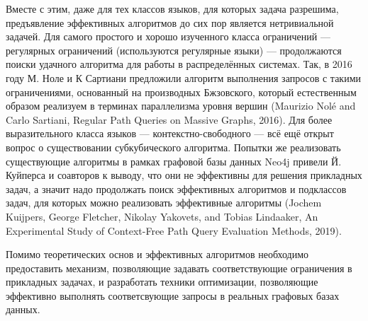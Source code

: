 \documentclass[12pt]{article}  %
\theoremstyle{remark}
\begin{document}
Вместе с этим, даже для тех классов языков, для которых задача разрешима, предъявление эффективных алгоритмов до сих пор является нетривиальной задачей.
Для самого простого и хорошо изученного класса ограничений --- регулярных ограничений (используются регулярные языки) --- продолжаются поиски удачного алгоритма для работы в распределённых системах.
Так, в 2016 году М. Ноле и К Сартиани предложили алгоритм выполнения запросов с такими ограничениями, основанный на производных Бжзовского, который естественным образом реализуем в терминах параллелизма уровня вершин (Maurizio Nolé and Carlo Sartiani, Regular Path Queries on Massive Graphs, 2016).
Для более выразительного класса языков --- контекстно-свободного --- всё ещё открыт вопрос о существовании субкубического алгоритма.
Попытки же реализовать существующие алгоритмы в рамках графовой базы данных  Neo4j привели Й. Куйперса и соавторов к выводу, что они не эффективны для решения прикладных задач, а значит надо продолжать поиск эффективных алгоритмов и подклассов задач, для которых можно реализовать эффективные алгоритмы (Jochem Kuijpers, George Fletcher, Nikolay Yakovets, and Tobias Lindaaker, An Experimental Study of Context-Free Path Query Evaluation Methods,  2019).

Помимо теоретических основ и эффективных алгоритмов необходимо предоставить механизм, позволяющие задавать соответствующие ограничения в прикладных задачах, и разработать техники оптимизации, позволяющие эффективно выполнять соответсвующие запросы в реальных графовых базах данных.
\end{document}
